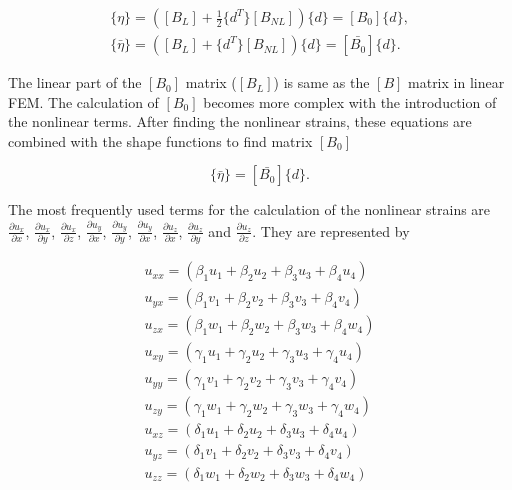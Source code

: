 \begin{equation}
\begin{array}{l}
\{\eta\} = \left([B_{L}] + \frac{1}{2}\{d^T\}[B_{NL}]\right)\{d\} = [B_{0}]\{d\}, \\
\{\bar{\eta}\} = \left([B_{L}] + \{d^T\}[B_{NL}]\right)\{d\} = [\bar{B_{0}}]\{d\}.
\end{array}
\label{eqn:4.3-1}
\end{equation}

The linear part of the $[B_{0}]$ matrix ($[B_{L}]$) is same as the $[B]$ matrix in linear FEM. The calculation of $[B_{0}]$ becomes more complex with the introduction of the nonlinear terms. After finding the nonlinear strains, these equations are combined with the shape functions to find matrix $[B_{0}]$

\begin{equation}
\{\bar{\eta}\} = [\bar{B_{0}}]\{d\}.
\label{eqn:4.3-2}
\end{equation}

\noindent The most frequently used terms for the calculation of the nonlinear strains are
$\frac{\partial{u_{x}}}{\partial{x}}$, $\frac{\partial{u_{x}}}{\partial{y}}$, $\frac{\partial{u_{x}}}{\partial{z}}$, $\frac{\partial{u_{y}}}{\partial{x}}$, $\frac{\partial{u_{y}}}{\partial{y}}$, $\frac{\partial{u_{y}}}{\partial{x}}$, $\frac{\partial{u_{z}}}{\partial{x}}$, $\frac{\partial{u_{z}}}{\partial{y}}$ and $\frac{\partial{u_{z}}}{\partial{z}}$. They are represented by

\begin{equation}
\begin{array}{l}
u_{xx} = (\beta_{1}u_{1} + \beta_{2}u_{2} + \beta_{3}u_{3} + \beta_{4}u_{4}) \\
u_{yx} = (\beta_{1}v_{1} + \beta_{2}v_{2} + \beta_{3}v_{3} + \beta_{4}v_{4}) \\
u_{zx} = (\beta_{1}w_{1} + \beta_{2}w_{2} + \beta_{3}w_{3} + \beta_{4}w_{4}) \\
u_{xy} = (\gamma_{1}u_{1} + \gamma_{2}u_{2} + \gamma_{3}u_{3} + \gamma_{4}u_{4}) \\
u_{yy} = (\gamma_{1}v_{1} + \gamma_{2}v_{2} + \gamma_{3}v_{3} + \gamma_{4}v_{4}) \\
u_{zy} = (\gamma_{1}w_{1} + \gamma_{2}w_{2} + \gamma_{3}w_{3} + \gamma_{4}w_{4}) \\
u_{xz} = (\delta_{1}u_{1} + \delta_{2}u_{2} + \delta_{3}u_{3} + \delta_{4}u_{4}) \\
u_{yz} = (\delta_{1}v_{1} + \delta_{2}v_{2} + \delta_{3}v_{3} + \delta_{4}v_{4}) \\
u_{zz} = (\delta_{1}w_{1} + \delta_{2}w_{2} + \delta_{3}w_{3} + \delta_{4}w_{4})
\end{array}
\label{eqn:4.3-3}
\end{equation}

